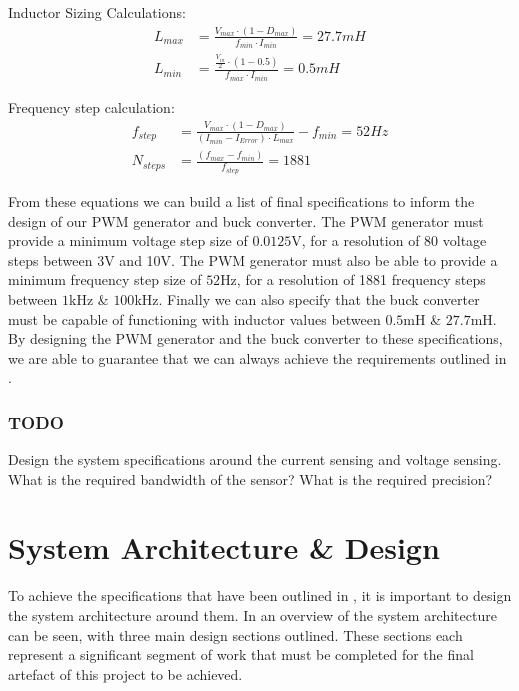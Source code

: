Inductor Sizing Calculations:
\begin{align}
    L_{max}&=\frac{V_{max}\cdot\left(1-D_{max}\right)}{f_{min}\cdot I_{min}} = 27.7mH \label{E:L_max}\\ 
    L_{min}&=\frac{\frac{V_{in}}{2}\cdot\left(1-0.5\right)}{f_{max}\cdot I_{min}} = 0.5mH \label{E:L_min}
\end{align}

Frequency step calculation:
\begin{align}
    f_{step}&=\frac{V_{max}\cdot\left(1-D_{max}\right)}{\left(I_{min}-I_{Error}\right)\cdot L_{max}}-f_{min} = 52Hz\\
    N_{steps}&=\frac{\left(f_{max}-f_{min}\right)}{f_{step}} = 1881 \label{E:f_step}
\end{align}

From these equations we can build a list of final specifications to inform the design of our PWM generator and buck converter. The PWM generator must provide a minimum voltage step size of $0.0125$V, for a resolution of 80 voltage steps between 3V and 10V. The PWM generator must also be able to provide a minimum frequency step size of $52$Hz, for a resolution of 1881 frequency steps between $1$kHz \& $100$kHz. Finally we can also specify that the buck converter must be capable of functioning with inductor values between $0.5$mH \& $27.7$mH. \\

By designing the PWM generator and the buck converter to these specifications, we are able to guarantee that we can always achieve the requirements outlined in .\\


\subsubsection{TODO}
Design the system specifications around the current sensing and voltage sensing. What is the required bandwidth of the sensor? What is the required precision?


\section{System Architecture \& Design}\label{S:system}

To achieve the specifications that have been outlined in , it is important to design the system architecture around them. In  an overview of the system architecture can be seen, with three main design sections outlined. These sections each represent a significant segment of work that must be completed for the final artefact of this project to be achieved. \\

